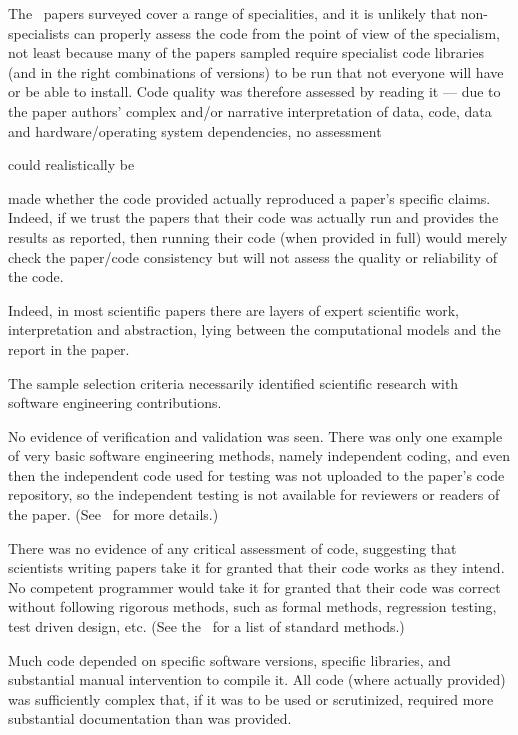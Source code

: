 \documentclass[10pt,a4paper]{article}
\begin{document}
The \the\dataN\ papers surveyed cover a range of specialities, and it is unlikely that non-specialists can properly assess the code from the point of view of the specialism, not least because many of the papers sampled require specialist code libraries (and in the right combinations of versions) to be run that not everyone will have or be able to install. Code quality was therefore assessed by reading it --- due to the paper authors' complex and/or narrative interpretation of data, code, data and hardware/operating system dependencies, no assessment \begin{change}could realistically be\end{change} made whether the code provided actually reproduced a paper's specific claims. Indeed, if we trust the papers that their code was actually run and provides the results as reported, then running their code (when provided in full) would merely check the paper/code consistency but will not assess the quality or reliability of the code. \begin{change}Indeed, in most scientific papers there are layers of expert scientific work, interpretation and abstraction, lying between the computational models and the report in the paper.\end{change}

\label{summary-of-results}
The sample selection criteria necessarily identified scientific research with software engineering contributions. 

No evidence of verification and validation was seen. There was only one example of very basic software engineering methods, namely independent coding, and even then the independent code used for testing was not uploaded to the paper's code repository, so the independent testing is not available for reviewers or readers of the paper. (See \supplement\ for more details.)

There was no evidence of any critical assessment of code, suggesting that scientists writing papers take it for granted that their code works as they intend. No competent programmer would take it for granted that their code was correct without following rigorous methods, such as formal methods, regression testing, test driven design, etc. (See the \supplement\ for a list of standard methods.)

Much code depended on specific software versions, specific libraries, and substantial manual intervention to compile it. All code (where actually provided) was sufficiently complex that, if it was to be used or scrutinized, required more substantial documentation than was provided.
\end{document}
